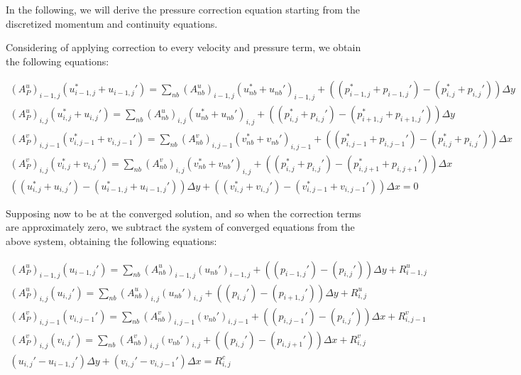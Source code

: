 In the following, we will derive the pressure correction equation starting from the discretized momentum and continuity equations.

Considering of applying correction to every velocity and pressure term, we obtain the following equations:

\begin{gather}
    (A_P^u)_{i-1,j} (u_{i-1,j}^* + u_{i-1,j}') = \sum_{nb} (A_{nb}^u)_{i-1,j} (u_{nb}^* + u_{nb}')_{i-1,j} + ((p_{i-1,j}^* + p_{i-1,j}') - (p_{i,j}^* + p_{i,j}')) \Delta y \\
    (A_P^u)_{i,j}   (u_{i,j}  ^* + u_{i,j}')   = \sum_{nb} (A_{nb}^u)_{i,j}   (u_{nb}^* + u_{nb}')_{i,j}   + ((p_{i,j}^*   + p_{i,j}') - (p_{i+1,j}^* + p_{i+1,j}')) \Delta y   \\
    (A_P^v)_{i,j-1} (v_{i,j-1}^* + v_{i,j-1}') = \sum_{nb} (A_{nb}^v)_{i,j-1} (v_{nb}^* + v_{nb}')_{i,j-1} + ((p_{i,j-1}^* + p_{i,j-1}') - (p_{i,j}^* + p_{i,j}')) \Delta x \\
    (A_P^v)_{i,j}   (v_{i,j}  ^* + v_{i,j}')   = \sum_{nb} (A_{nb}^v)_{i,j}   (v_{nb}^* + v_{nb}')_{i,j}   + ((p_{i,j}^*   + p_{i,j}') - (p_{i,j+1}^* + p_{i,j+1}')) \Delta x   \\
    ((u_{i,j}^* + u_{i,j}') - (u_{i-1,j}^* + u_{i-1,j}')) \Delta y + ((v_{i,j}^* + v_{i,j}') - (v_{i,j-1}^* + v_{i,j-1}')) \Delta x = 0 \label{eq:SIMPLE_continuity_equation}
\end{gather}

Supposing now to be at the converged solution, and so when the correction terms are approximately zero, we subtract the system of converged equations from the above system, obtaining the following equations:

\begin{gather}
    (A_P^u)_{i-1,j} (u_{i-1,j}') = \sum_{nb} (A_{nb}^u)_{i-1,j} (u_{nb}')_{i-1,j} + ((p_{i-1,j}') - (p_{i,j}')) \Delta y + R^u_{i-1,j} \\
    (A_P^u)_{i,j}   (u_{i,j}')   = \sum_{nb} (A_{nb}^u)_{i,j}   (u_{nb}')_{i,j}   + ((p_{i,j}') - (p_{i+1,j}')) \Delta y + R^u_{i,j}   \\
    (A_P^v)_{i,j-1} (v_{i,j-1}') = \sum_{nb} (A_{nb}^v)_{i,j-1} (v_{nb}')_{i,j-1} + ((p_{i,j-1}') - (p_{i,j}')) \Delta x + R^v_{i,j-1} \\
    (A_P^v)_{i,j}   (v_{i,j}')   = \sum_{nb} (A_{nb}^v)_{i,j}   (v_{nb}')_{i,j}   + ((p_{i,j}') - (p_{i,j+1}')) \Delta x + R^v_{i,j}   \\
    (u_{i,j}' - u_{i-1,j}') \Delta y + (v_{i,j}' - v_{i,j-1}') \Delta x = R^c_{i,j}
\end{gather}


